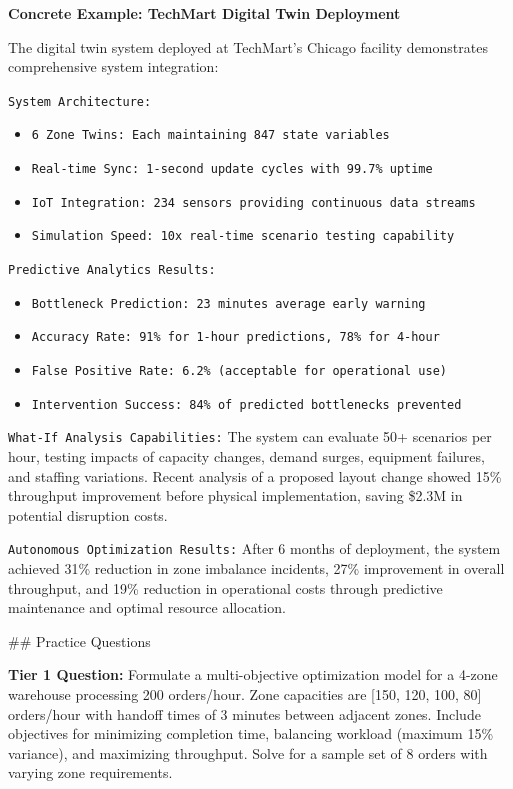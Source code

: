 \documentclass{article}
\begin{document}
\textbf{Concrete Example: TechMart Digital Twin Deployment}

The digital twin system deployed at TechMart's Chicago facility demonstrates comprehensive system integration:

\texttt{System Architecture:}
\begin{itemize}
\item \texttt{6 Zone Twins: Each maintaining 847 state variables}
\item \texttt{Real-time Sync: 1-second update cycles with 99.7\% uptime}
\item \texttt{IoT Integration: 234 sensors providing continuous data streams}
\item \texttt{Simulation Speed: 10x real-time scenario testing capability}
\end{itemize}

\texttt{Predictive Analytics Results:}
\begin{itemize}
\item \texttt{Bottleneck Prediction: 23 minutes average early warning}
\item \texttt{Accuracy Rate: 91\% for 1-hour predictions, 78\% for 4-hour}
\item \texttt{False Positive Rate: 6.2\% (acceptable for operational use)}
\item \texttt{Intervention Success: 84\% of predicted bottlenecks prevented}
\end{itemize}

\texttt{What-If Analysis Capabilities:}
The system can evaluate 50+ scenarios per hour, testing impacts of capacity changes, demand surges, equipment failures, and staffing variations. Recent analysis of a proposed layout change showed 15\% throughput improvement before physical implementation, saving \$2.3M in potential disruption costs.

\texttt{Autonomous Optimization Results:}
After 6 months of deployment, the system achieved 31\% reduction in zone imbalance incidents, 27\% improvement in overall throughput, and 19\% reduction in operational costs through predictive maintenance and optimal resource allocation.

## Practice Questions

\textbf{Tier 1 Question:} Formulate a multi-objective optimization model for a 4-zone warehouse processing 200 orders/hour. Zone capacities are [150, 120, 100, 80] orders/hour with handoff times of 3 minutes between adjacent zones. Include objectives for minimizing completion time, balancing workload (maximum 15\% variance), and maximizing throughput. Solve for a sample set of 8 orders with varying zone requirements.
\end{document}
